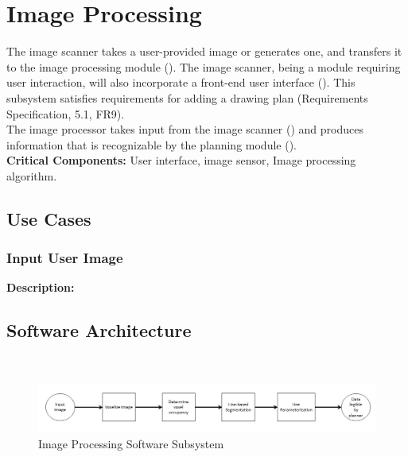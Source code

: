 
\section{Image Processing}
\label{sec:image_processing}
The image scanner takes a user-provided image or generates one, and transfers it to the image processing module (). The image scanner, being a module requiring user interaction, will also incorporate a front-end user interface (). This subsystem satisfies requirements for adding a drawing plan (Requirements Specification, 5.1, FR9). \\

The image processor takes input from the image scanner () and produces information that is recognizable by the planning module (). \\

\noindent
\textbf{Critical Components:} User interface, image sensor, Image processing algorithm. 

\subsection{Use Cases}
\subsubsection{Input User Image}
\textbf{Description:}  


\subsection{Software Architecture}
\label{sec:sw_arch_image_processing}
 \\

\begin{figure}[h!]
 \centering
  \includegraphics[width=0.99\columnwidth]{diagrams/sw_arch_image_processing.jpg}
	\caption{Image Processing Software Subsystem}
 \label{fig:image_processing}
\end{figure}

